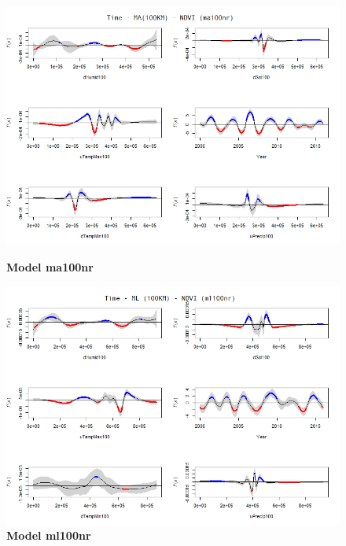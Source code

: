 \begin{figure}[H]
    \begin{minipage}{0.8\textwidth}
        \centering
        \includegraphics[width=1.2\textwidth]{ma100nr.png} %
        \caption{\textbf{Model ma100nr}}
    \end{minipage}\hfill
    \begin{minipage}{0.8\textwidth}
        \centering
        \includegraphics[width=1.2\textwidth]{ml100nr.png} %
        \caption{\textbf{Model ml100nr}}
    \end{minipage}
\end{figure}

